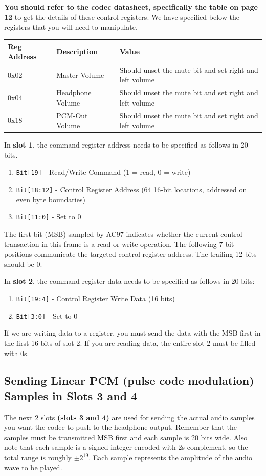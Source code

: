 \documentclass[11pt]{article}
\begin{document}
\textbf{You should refer to the codec datasheet, specifically the table on page 12} to get the details of these control registers. We have specified below the registers that you will need to manipulate.

\begin{center}
	\begin{tabular}{ | l | l | p{10cm} |}
		\hline
		\textbf{Reg Address} & \textbf{Description} & \textbf{Value} \\ \hline
		0x02 & Master Volume & Should unset the mute bit and set right and left volume \\ \hline
		0x04 & Headphone Volume & Should unset the mute bit and set right and left volume \\ \hline
		0x18 & PCM-Out Volume & Should unset the mute bit and set right and left volume \\ \hline
	\end{tabular}
\end{center}

In \textbf{slot 1}, the command register address needs to be specified as follows in 20 bits.
\begin{enumerate}
	\item \verb|Bit[19]| - Read/Write Command (1 = read, 0 = write)
	\item \verb|Bit[18:12]| - Control Register Address (64 16-bit locations, addressed on even byte boundaries)
	\item \verb|Bit[11:0]| - Set to 0
\end{enumerate}

The first bit (MSB) sampled by AC97 indicates whether the current control transaction in this frame is a read or write operation. The following 7 bit positions communicate the targeted control register address. The trailing 12 bits should be 0.

In \textbf{slot 2}, the command register data needs to be specified as follows in 20 bits:

\begin{enumerate}
	\item \verb|Bit[19:4]| - Control Register Write Data (16 bits)
	\item \verb|Bit[3:0]| - Set to 0
\end{enumerate}

If we are writing data to a register, you must send the data with the MSB first in the first 16 bits of slot 2. If you are reading data, the entire slot 2 must be filled with 0s.

\subsection{Sending Linear PCM (pulse code modulation) Samples in Slots 3 and 4}
The next 2 slots \textbf{(slots 3 and 4)} are used for sending the actual audio samples you want the codec to push to the headphone output. Remember that the samples must be transmitted MSB first and each sample is 20 bits wide. Also note that each sample is a signed integer encoded with 2s complement, so the total range is roughly $\pm 2^{19}$. Each sample represents the amplitude of the audio wave to be played.
\end{document}
